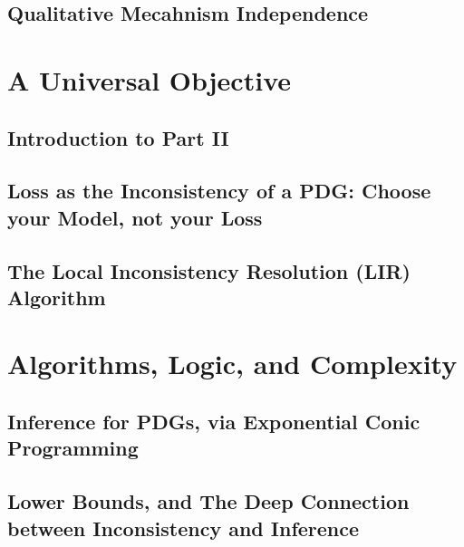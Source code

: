 \documentclass[tocprelim,
    ]{cornellmodified}
\begin{document}
\chapter{Qualitative Mecahnism Independence}
    

\part{A Universal Objective} \label{part:univ-objective}

\chapter*{Introduction to Part II}
    

\chapter{Loss as the Inconsistency of a PDG: 
    Choose your Model, not your Loss}
    
\chapter{ The Local Inconsistency Resolution (LIR) Algorithm }
    
    
\part{Algorithms, Logic, and Complexity%
    } \label{part:algo-logic-complexity}

\chapter{Inference for PDGs, via Exponential Conic Programming}
    

\chapter[Lower Bounds, and the Deep Connection\texorpdfstring{\\}{}between Inconsistency and Inference]%
    {Lower Bounds, and The Deep Connection between Inconsistency and Inference}
    
\end{document}
